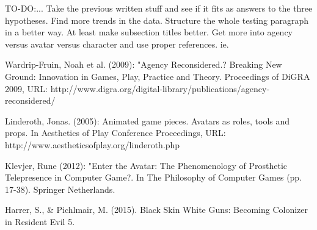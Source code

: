 TO-DO:...
Take the previous written stuff and see if it fits as answers to the three hypotheses. Find more trends in the data. Structure the whole testing paragraph in a better way. At least make subsection titles better. Get more into agency versus avatar versus character and use proper references.
ie. 

Wardrip-Fruin, Noah et al. (2009): "Agency Reconsidered.? Breaking New Ground: Innovation in Games, Play, Practice and Theory. Proceedings of DiGRA 2009, URL: http://www.digra.org/digital-library/publications/agency-reconsidered/

Linderoth, Jonas. (2005): Animated game pieces. Avatars as roles, tools and props. In Aesthetics of Play Conference Proceedings, URL: http://www.aestheticsofplay.org/linderoth.php

Klevjer, Rune (2012): "Enter the Avatar: The Phenomenology of Prosthetic Telepresence in Computer Game?. In The Philosophy of Computer Games (pp. 17-38). Springer Netherlands.

Harrer, S., & Pichlmair, M. (2015). Black Skin White Guns: Becoming Colonizer in Resident Evil 5.




